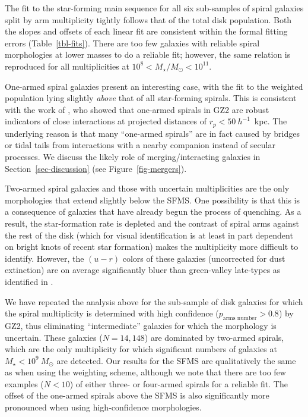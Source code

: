 \documentclass[useAMS,usenatbib]{mn2e}
\begin{document}
The fit to the star-forming main sequence for all six sub-samples of spiral galaxies split by arm multiplicity tightly follows that of the total disk population. Both the slopes and offsets of each linear fit are consistent within the formal fitting errors (Table~\ref{tbl-fits}). There are too few galaxies with reliable spiral morphologies at lower masses to do a reliable fit; however, the same relation is reproduced for all multiplicities at $10^8<M_\star/M_\odot<10^{11}$. 

One-armed spiral galaxies present an interesting case, with the fit to the weighted population lying slightly \emph{above} that of all star-forming spirals. This is consistent with the work of \citet{cas13}, who showed that one-armed spirals in GZ2 are robust indicators of close interactions at projected distances of $r_p < 50~h^{-1}$~kpc. The underlying reason is that many ``one-armed spirals'' are in fact caused by bridges or tidal tails from interactions with a nearby companion instead of secular processes. We discuss the likely role of merging/interacting galaxies in Section~\ref{sec-discussion} (see Figure~\ref{fig-mergers}).

Two-armed spiral galaxies and those with uncertain multiplicities are the only morphologies that extend slightly below the SFMS. One possibility is that this is a consequence of galaxies that have already begun the process of quenching. As a result, the star-formation rate is depleted and the contrast of spiral arms against the rest of the disk (which for visual identification is at least in part dependent on bright knots of recent star formation) makes the multiplicity more difficult to identify. However, the $(u-r)$ colors of these galaxies (uncorrected for dust extinction) are on average significantly bluer than green-valley late-types as identified in \citet{sch14}.

We have repeated the analysis above for the sub-sample of disk galaxies for which the spiral multiplicity is determined with high confidence ($p_\textrm{arms~number} > 0.8$) by GZ2, thus eliminating ``intermediate'' galaxies for which the morphology is uncertain. These galaxies ($N=14,148$) are dominated by two-armed spirals, which are the only multiplicity for which significant numbers of galaxies at $M_\star<10^9~M_\odot$ are detected. Our results for the SFMS are qualitatively the same as when using the weighting scheme, although we note that there are too few examples ($N<10$) of either three- or four-armed spirals for a reliable fit. The offset of the one-armed spirals above the SFMS is also significantly more pronounced when using high-confidence morphologies.
\end{document}
